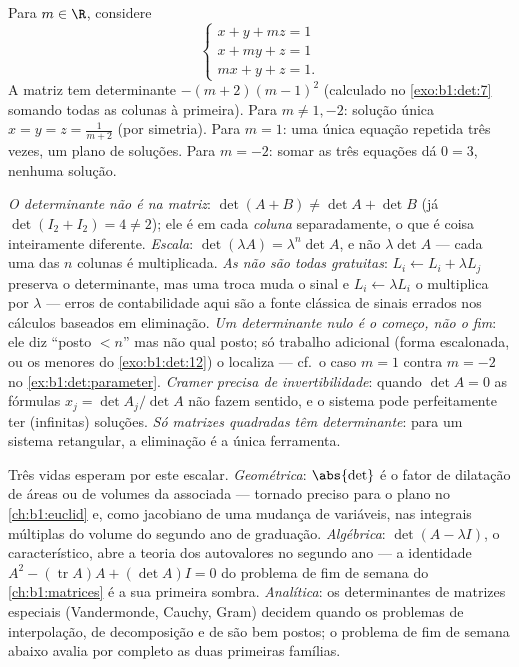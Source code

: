 \begin{example}\label{ex:b1:det:parameter}
Para $m \in \R$, considere
\[
\begin{cases}
x + y + mz = 1\\
x + my + z = 1\\
mx + y + z = 1 .
\end{cases}
\]
A matriz tem determinante $-(m+2)(m-1)^2$ (calculado no \cref{exo:b1:det:7} somando todas as
colunas à primeira). Para $m
\neq 1, -2$: solução única $x = y = z = \frac{1}{m+2}$ (por simetria).
Para $m = 1$: uma única equação repetida três vezes, um plano de
soluções. Para $m = -2$: somar as três equações dá $0 = 3$, nenhuma
solução.
\end{example}

\begin{remark}
\label{rem:b1:det:pitfalls}
\emph{O determinante não é  na matriz}: $\det(A + B)
\neq \det A + \det B$ (já $\det(I_2 + I_2) = 4 \neq 2$); ele
é  em cada \emph{coluna} separadamente, o que é coisa
inteiramente diferente.
\emph{Escala}: $\det(\lambda A) = \lambda^n\det A$, e não $\lambda\det A$ --- cada uma das $n$ colunas é
multiplicada.
\emph{As  não são todas gratuitas}: $L_i \leftarrow L_i +
\lambda L_j$
preserva o determinante, mas uma troca muda o sinal e $L_i \leftarrow \lambda L_i$ o
multiplica por $\lambda$ --- erros de contabilidade aqui são a fonte
clássica de sinais errados nos cálculos baseados em eliminação.
\emph{Um determinante nulo é o começo, não o fim}: ele diz ``posto
$< n$'' mas não qual posto; só trabalho adicional (forma escalonada,
ou os menores do \cref{exo:b1:det:12}) o localiza --- cf.\ o caso $m = 1$ contra
$m = -2$ no \cref{ex:b1:det:parameter}.
\emph{Cramer precisa de invertibilidade}: quando $\det A = 0$ as fórmulas
$x_j = \det A_j/\det A$ não fazem sentido, e o sistema pode perfeitamente ter
(infinitas) soluções.
\emph{Só matrizes quadradas têm determinante}: para um sistema
retangular, a eliminação é a única ferramenta.
\end{remark}

\begin{remark}
\label{rem:b1:det:whereused}
Três vidas esperam por este escalar. \emph{Geométrica}: $\abs{\det}$ é o
fator de dilatação de áreas ou de volumes da  associada ---
tornado preciso para o plano no \cref{ch:b1:euclid} e, como jacobiano de uma
mudança de variáveis, nas integrais múltiplas do volume do segundo
ano de graduação. \emph{Algébrica}: $\det(A - \lambda I)$, o 
característico, abre a teoria dos autovalores no segundo ano --- a
identidade $A^2 - (\operatorname{tr} A)A + (\det A)I = 0$ do problema de fim de semana do \cref{ch:b1:matrices} é a sua
primeira sombra. \emph{Analítica}: os determinantes de matrizes
especiais (Vandermonde, Cauchy, Gram) decidem quando os problemas de
interpolação, de decomposição e de  são bem postos; o
problema de fim de semana abaixo avalia por completo as duas
primeiras famílias.
\end{remark}

